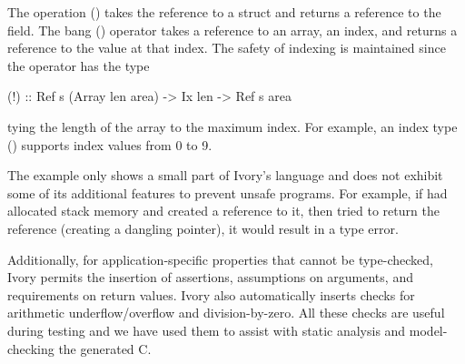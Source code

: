 The operation () takes the reference to a struct and
returns a reference to the  field.  The bang (\cd{!}) operator takes a
reference to an array, an index, and returns a reference to the value at that
index.  The safety of indexing is maintained since the operator has the type
\begin{code}
(!) :: Ref s (Array len area) -> Ix len -> Ref s area
\end{code}
\noindent
tying the length of the array to the maximum index.  For example, an index type
() supports index values from 0 to 9.

The example only shows a small part of Ivory's language and does not exhibit
some of its additional features to prevent unsafe programs.  For example, if
 had allocated stack memory and created a reference to it, then tried
to return the reference (creating a dangling pointer), it would result in a type
error.

Additionally, for application-specific properties that cannot be type-checked,
Ivory permits the insertion of assertions, assumptions on arguments, and
requirements on return values.  Ivory also automatically inserts checks for
arithmetic underflow/overflow and division-by-zero.  All these checks are useful
during testing and we have used them to assist with static analysis and
model-checking the generated C.








